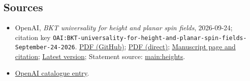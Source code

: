 \documentclass[11pt]{article}
\begin{document}
\subsection{Sources}
\begin{itemize}
\item OpenAI, \emph{BKT universality for height and planar spin fields}, 2026-09-24; citation key \texttt{OAI:BKT-universality-for-height-and-planar-spin-fields-September-24-2026}. \href{https://github.com/openai/math/blob/adc7f1241b42e322a6451854ab7e4b4c146bf78a/preprints/BKT-universality-for-height-and-planar-spin-fields-September-24-2026/paper.pdf}{PDF (GitHub)}; \href{https://github.com/openai/math/raw/adc7f1241b42e322a6451854ab7e4b4c146bf78a/preprints/BKT-universality-for-height-and-planar-spin-fields-September-24-2026/paper.pdf}{PDF (direct)}; \href{https://github.com/openai/math/blob/adc7f1241b42e322a6451854ab7e4b4c146bf78a/preprints/BKT-universality-for-height-and-planar-spin-fields-September-24-2026/README.md}{Manuscript page and citation}; \href{https://github.com/openai/math/blob/main/preprints/BKT-universality-for-height-and-planar-spin-fields-September-24-2026/paper.pdf}{Latest version}; Statement source: \href{https://github.com/openai/math/blob/adc7f1241b42e322a6451854ab7e4b4c146bf78a/preprints/BKT-universality-for-height-and-planar-spin-fields-September-24-2026/build/sections/introduction.tex\#L73}{main:heights}.
\item \href{https://github.com/openai/math/blob/adc7f1241b42e322a6451854ab7e4b4c146bf78a/CONTENTS.md}{OpenAI catalogue entry}.
\end{itemize}
\end{document}
